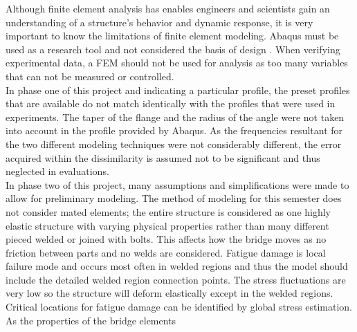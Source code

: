 \indent Although finite element analysis has enables engineers and scientists gain an understanding of a structure's behavior and dynamic response, it is
very important to know the limitations of finite element modeling. Abaqus must be used as a research tool and not considered the basis of design
\cite{Abaqus}. When verifying experimental data, a FEM should not be used for analysis as too many variables that can not be measured or controlled. \\
\indent In phase one of this project and indicating a particular profile, the preset profiles that are available do not match identically with the
profiles that were used in experiments. The taper of the flange and the radius of the angle were not taken into account in the profile provided by
Abaqus. As the frequencies resultant for the two different modeling techniques were not considerably different, the error acquired within the
dissimilarity is assumed not to be significant and thus neglected in evaluations. \\
\indent In phase two of this project, many assumptions and simplifications were made to allow for preliminary modeling. The method of modeling for this
semester does not consider mated elements; the entire structure is considered as one highly elastic structure with varying physical properties rather
than many different pieced welded or joined with bolts. This affects how the bridge moves as no friction between parts and no welds are considered. 
\indent Fatigue damage is local failure mode and occurs most often in welded regions and thus the model should include the detailed welded region
connection points. The stress fluctuations are very low so the structure will deform elastically except in the welded regions. Critical locations for
fatigue damage can be identified by global stress estimation. As the properties of the bridge elements \cite{manoj}\\
